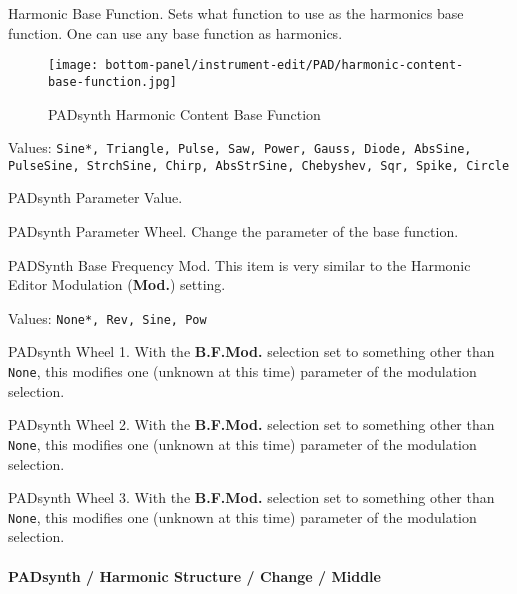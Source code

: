    Harmonic Base Function.
   Sets what function to use as the harmonics base function.
   One can use any base function as harmonics.

\begin{figure}[H]
   \centering
   \texttt{[image: bottom-panel/instrument-edit/PAD/harmonic-content-base-function.jpg]}
   \caption{PADsynth Harmonic Content Base Function}
   \label{fig:padsynth_harmonic_content_base_function}
\end{figure}

   Values: \texttt{Sine*, Triangle, Pulse, Saw, Power, Gauss, Diode, AbsSine,
           PulseSine, StrchSine, Chirp, AbsStrSine, Chebyshev,
           Sqr, Spike, Circle}

   PADsynth Parameter Value.

   PADsynth Parameter Wheel.
   Change the parameter of the base function.

   PADSynth Base Frequency Mod.
   This item is very similar to the Harmonic Editor Modulation
   (\textbf{Mod.}) setting.

   Values: \texttt{None*, Rev, Sine, Pow}

   PADsynth Wheel 1.
   With the \textbf{B.F.Mod.} selection set to something other than
   \texttt{None}, this modifies one (unknown at this time) parameter of the
   modulation selection.

   PADsynth Wheel 2.
   With the \textbf{B.F.Mod.} selection set to something other than
   \texttt{None}, this modifies one (unknown at this time) parameter of the
   modulation selection.

   PADsynth Wheel 3.
   With the \textbf{B.F.Mod.} selection set to something other than
   \texttt{None}, this modifies one (unknown at this time) parameter of the
   modulation selection.

\paragraph{PADsynth / Harmonic Structure / Change / Middle}
\label{paragraph:padsynth_harmonic_structure_change_middle}

